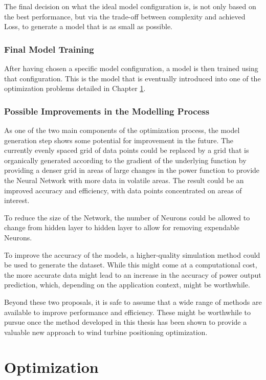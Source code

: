 \documentclass[preprint,12pt]{elsarticle}
\begin{document}
The final decision on what the ideal model configuration is, is not only based on the best performance, but via the trade-off between complexity and achieved Loss, to generate a model that is as small as possible.


\subsubsection{Final Model Training}

After having chosen a specific model configuration, a model is then trained using that configuration. This is the model that is eventually introduced into one of the optimization problems detailed in Chapter \ref{section:optimization}.

\subsubsection{Possible Improvements in the Modelling Process}

As one of the two main components of the optimization process, the model generation step shows some potential for improvement in the future. The currently evenly spaced grid of data points could be replaced by a grid that is organically generated according to the gradient of the underlying function by providing a denser grid in areas of large changes in the power function to provide the Neural Network with more data in volatile areas. The result could be an improved accuracy and efficiency, with data points concentrated on areas of interest.   

To reduce the size of the Network, the number of Neurons could be allowed to change from hidden layer to hidden layer to allow for removing expendable Neurons. 

To improve the accuracy of the models, a higher-quality simulation method could be used to generate the dataset. While this might come at a computational cost, the more accurate data might lead to an increase in the  accuracy of power output prediction, which, depending on the application context, might be worthwhile.  

Beyond these two proposals, it is safe to assume that a wide range of methods are available to improve performance and efficiency. These might be worthwhile to pursue once the method developed in this thesis has been shown to provide a valuable new approach to wind turbine positioning optimization.

\section{Optimization}\label{section:optimization}
\end{document}

